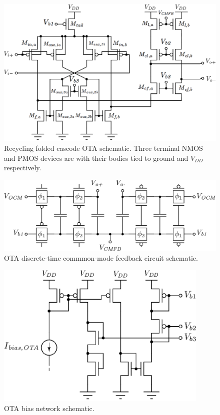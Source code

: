 \begin{figure}[!t]
	\centering
	\includegraphics[width=5.5in]{./Figures/Filter/OTA_post.eps}
	\caption{Recycling folded cascode OTA schematic. Three terminal NMOS and PMOS devices are with their bodies tied to ground and $V_\textit{DD}$ respectively.}\label{fig:OTA_post}
\end{figure}

\begin{figure}[!t]
	\centering
	\includegraphics[width=4.6in]{./Figures/Filter/CMFB_post.eps}
	\caption{OTA discrete-time commmon-mode feedback circuit schematic.}\label{fig:CMFB_post}
\end{figure}

\begin{figure}[!t]
	\centering
	\includegraphics[width=4in]{./Figures/Filter/bias_ota_post.eps}
	\caption{OTA bias network schematic.}\label{fig:bias_ota_post}
\end{figure}

